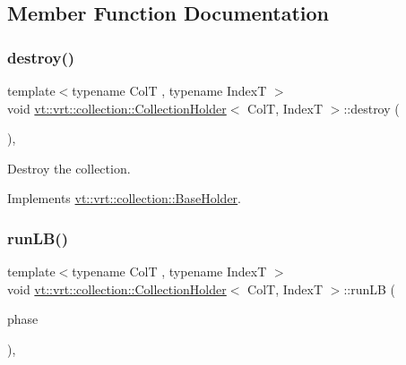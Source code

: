 \subsection{Member Function Documentation}
\mbox{\label{structvt_1_1vrt_1_1collection_1_1_collection_holder_a744d2a48f9f22db59b2705b3d3f3d1ca}} 
\subsubsection{\texorpdfstring{destroy()}{destroy()}}
{\footnotesize\ttfamily template$<$typename ColT , typename IndexT $>$ \\
void \hyperlink{structvt_1_1vrt_1_1collection_1_1_collection_holder}{vt\+::vrt\+::collection\+::\+Collection\+Holder}$<$ ColT, IndexT $>$\+::destroy (\begin{DoxyParamCaption}{ }\end{DoxyParamCaption})\hspace{0.3cm}{\ttfamily [override]}, {\ttfamily [virtual]}}



Destroy the collection. 



Implements \hyperlink{structvt_1_1vrt_1_1collection_1_1_base_holder_a56c8289f60121e38f3699bcfafbbd491}{vt\+::vrt\+::collection\+::\+Base\+Holder}.

\mbox{\label{structvt_1_1vrt_1_1collection_1_1_collection_holder_a09a3f3e6ec221f36f3417713e64e8f69}} 
\subsubsection{\texorpdfstring{run\+L\+B()}{runLB()}}
{\footnotesize\ttfamily template$<$typename ColT , typename IndexT $>$ \\
void \hyperlink{structvt_1_1vrt_1_1collection_1_1_collection_holder}{vt\+::vrt\+::collection\+::\+Collection\+Holder}$<$ ColT, IndexT $>$\+::run\+LB (\begin{DoxyParamCaption}\item[{\hyperlink{namespacevt_a46ce6733d5cdbd735d561b7b4029f6d7}{Phase\+Type}}]{phase }\end{DoxyParamCaption})\hspace{0.3cm}{\ttfamily [override]}, {\ttfamily [virtual]}}



